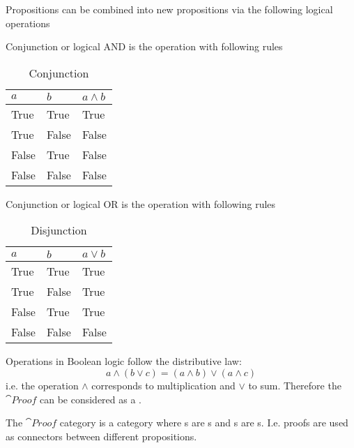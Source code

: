 Propositions can be combined into new propositions via the following
logical operations
\begin{definition}[Conjunction]
\label{def:conjunction}
Conjunction or logical AND is the operation with following rules
  \begin{table}[H]
    \centering
    \caption{Conjunction}
    \label{tab:conjunction}
      \begin{tabular}{|l|l|l|}
        \hline
        $a$ & $b$ & $a \land b$ \\ \hline
        True & True & True \\ \hline
        True & False & False \\ \hline
        False & True & False \\ \hline
        False & False & False \\ \hline
      \end{tabular}
  \end{table}
\end{definition}
\begin{definition}[Disjunction]
\label{def:disjunction}
Conjunction or logical OR is the operation with following rules
  \begin{table}[H]
    \centering
    \caption{Disjunction}
    \label{tab:disjunction}
      \begin{tabular}{|l|l|l|}
        \hline
        $a$ & $b$ & $a \lor b$ \\ \hline
        True & True & True \\ \hline
        True & False & True \\ \hline
        False & True & True \\ \hline
        False & False & False \\ \hline
      \end{tabular}
  \end{table}
\end{definition}

Operations in Boolean logic follow the distributive law:
\begin{equation}
a \land ( b \lor c) = (a \land b) \lor (a \land c) 
\label{eq:distributive_law_boolean}
\end{equation}
i.e. the operation $\land$ corresponds to multiplication and $\lor$ to
sum. Therefore the $\cat{Proof}$ can be considered as a
. 

\begin{definition}
\label{def:proof_category}
The $\cat{Proof}$ category is a category where s are
s and s are
s. I.e. proofs are used as connectors between
different propositions.
\end{definition}

